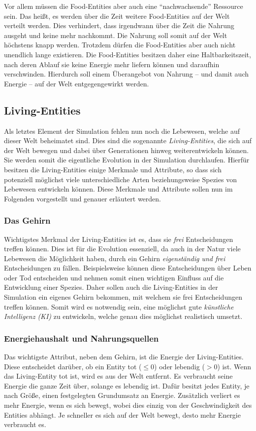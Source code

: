 \documentclass[course=erap]{aspdoc}
\begin{document}
Vor allem müssen die Food-Entities aber auch eine "`nachwachsende"' Ressource sein. Das heißt, es werden über die Zeit weitere Food-Entities auf der Welt verteilt werden. Dies verhindert, dass irgendwann über die Zeit die Nahrung ausgeht und keine mehr nachkommt. Die Nahrung soll somit auf der Welt höchstens knapp werden. Trotzdem dürfen die Food-Entities aber auch nicht unendlich lange existieren. Die Food-Entities besitzen daher eine Haltbarkeitszeit, nach deren Ablauf sie keine Energie mehr liefern können und daraufhin verschwinden. Hierdurch soll einem Überangebot von Nahrung -- und damit auch Energie -- auf der Welt entgegengewirkt werden.


\subsection{Living-Entities}
Als letztes Element der Simulation fehlen nun noch die Lebewesen, welche auf dieser Welt beheimatet sind. Dies sind die sogenannte \emph{Living-Entities}, die sich auf der Welt bewegen und dabei über Generationen hinweg weiterentwickeln können. Sie werden somit die eigentliche Evolution in der Simulation durchlaufen. Hierfür besitzen die Living-Entities einige Merkmale und Attribute, so dass sich potenziell möglichst viele unterschiedliche Arten beziehungsweise Spezies von Lebewesen entwickeln können. Diese Merkmale und Attribute sollen nun im Folgenden vorgestellt und genauer erläutert werden.


\subsubsection{Das Gehirn}
Wichtigstes Merkmal der Living-Entities ist es, dass sie \emph{frei} Entscheidungen treffen können. Dies ist für die Evolution essenziell, da auch in der Natur viele Lebewesen die Möglichkeit haben, durch ein Gehirn \emph{eigenständig und frei} Entscheidungen zu fällen. Beispielsweise können diese Entscheidungen über Leben oder Tod entscheiden und nehmen somit einen wichtigen Einfluss auf die Entwicklung einer Spezies. Daher sollen auch die Living-Entities in der Simulation ein eigenes Gehirn bekommen, mit welchem sie frei Entscheidungen treffen können. Somit wird es notwendig sein, eine möglichst gute \emph{künstliche Intelligenz (KI)} zu entwickeln, welche genau dies möglichst realistisch umsetzt.


\subsubsection{Energiehaushalt und Nahrungsquellen}
Das wichtigste Attribut, neben dem Gehirn, ist die Energie der Living-Entities. Diese entscheidet darüber, ob ein Entity tot (\(\leq 0\)) oder lebendig (\(> 0\)) ist. Wenn das Living-Entity tot ist, wird es aus der Welt entfernt. Es verbraucht seine Energie die ganze Zeit über, solange es lebendig ist. Dafür besitzt jedes Entity, je nach Größe, einen festgelegten Grundumsatz an Energie. Zusätzlich verliert es mehr Energie, wenn es sich bewegt, wobei dies einzig von der Geschwindigkeit des Entities abhängt. Je schneller es sich auf der Welt bewegt, desto mehr Energie verbraucht es.
\end{document}
